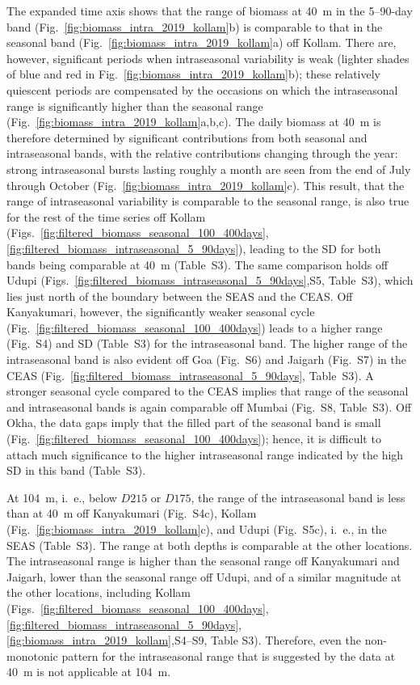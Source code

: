 \documentclass[authoryear,review,11pt]{elsarticle}
\begin{document}
The expanded time axis shows that the range of biomass at 40~m in the 5--90-day band (Fig.~\ref{fig:biomass_intra_2019_kollam}b) is comparable to that in the seasonal band (Fig.~\ref{fig:biomass_intra_2019_kollam}a) off Kollam.  There are, however, significant periods when intraseasonal variability is weak (lighter shades of blue and red in Fig.~\ref{fig:biomass_intra_2019_kollam}b); these relatively quiescent periods are compensated by the occasions on which the intraseasonal range is significantly higher than the seasonal range (Fig.~\ref{fig:biomass_intra_2019_kollam}a,b,c). The daily biomass at 40~m is therefore determined by significant contributions from both seasonal and intraseasonal bands, with the relative contributions changing through the year: strong intraseasonal bursts lasting roughly a month are seen from the end of July through October (Fig.~\ref{fig:biomass_intra_2019_kollam}c). This result, that the range of intraseasonal variability is comparable to the seasonal range, is also true for the rest of the time series off Kollam (Figs.~\ref{fig:filtered_biomass_seasonal_100_400days},\ref{fig:filtered_biomass_intraseasonal_5_90days}), leading to the SD for both bands being comparable at 40~m (Table~S3).  The same comparison holds off Udupi (Figs.~\ref{fig:filtered_biomass_intraseasonal_5_90days},S5, Table~S3), which lies just north of the boundary between the SEAS and the CEAS.  Off Kanyakumari, however, the significantly weaker seasonal cycle (Fig.~\ref{fig:filtered_biomass_seasonal_100_400days}) leads to a higher range (Fig.~S4) and SD (Table~S3) for the intraseasonal band.  The higher range of the intraseasonal band is also evident off Goa (Fig.~S6) and Jaigarh (Fig.~S7) in the CEAS (Fig.~\ref{fig:filtered_biomass_intraseasonal_5_90days}, Table~S3). A stronger seasonal cycle compared to the CEAS implies that range of the seasonal and intraseasonal bands is again comparable off Mumbai (Fig.~S8, Table~S3).  Off Okha, the data gaps imply that the filled part of the seasonal band is small (Fig.~\ref{fig:filtered_biomass_seasonal_100_400days}); hence, it is difficult to attach much significance to the higher intraseasonal range indicated by the high SD in this band (Table~S3).

At 104~m, i.~e., below $D215$ or $D175$, the range of the intraseasonal band is less than at 40~m off Kanyakumari (Fig.~S4c), Kollam (Fig.~\ref{fig:biomass_intra_2019_kollam}c), and Udupi (Fig.~S5c), i.~e., in the SEAS (Table~S3).  The range at both depths is comparable at the other locations. The intraseasonal range is higher than the seasonal range off Kanyakumari and Jaigarh, lower than the seasonal range off Udupi, and of a similar magnitude at the other locations, including Kollam (Figs.~\ref{fig:filtered_biomass_seasonal_100_400days},\ref{fig:filtered_biomass_intraseasonal_5_90days},\ref{fig:biomass_intra_2019_kollam},S4--S9, Table S3). Therefore, even the non-monotonic pattern for the intraseasonal range that is suggested by the data at 40~m is not applicable at 104~m.
\end{document}
